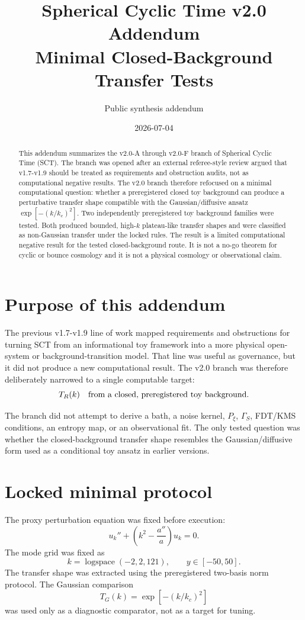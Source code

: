 \documentclass[11pt,a4paper]{article}
\title{Spherical Cyclic Time v2.0 Addendum\\Minimal Closed-Background Transfer Tests}
\author{Public synthesis addendum}
\date{2026-07-04}
\begin{document}
\maketitle

\begin{abstract}
This addendum summarizes the v2.0-A through v2.0-F branch of Spherical Cyclic Time (SCT). The branch was opened after an external referee-style review argued that v1.7-v1.9 should be treated as requirements and obstruction audits, not as computational negative results. The v2.0 branch therefore refocused on a minimal computational question: whether a preregistered closed toy background can produce a perturbative transfer shape compatible with the Gaussian/diffusive ansatz $\exp[-(k/k_c)^2]$. Two independently preregistered toy background families were tested. Both produced bounded, high-$k$ plateau-like transfer shapes and were classified as non-Gaussian transfer under the locked rules. The result is a limited computational negative result for the tested closed-background route. It is not a no-go theorem for cyclic or bounce cosmology and it is not a physical cosmology or observational claim.
\end{abstract}

\section{Purpose of this addendum}
The previous v1.7-v1.9 line of work mapped requirements and obstructions for turning SCT from an informational toy framework into a more physical open-system or background-transition model. That line was useful as governance, but it did not produce a new computational result. The v2.0 branch was therefore deliberately narrowed to a single computable target:
\[
T_R(k)\quad \hbox{from a closed, preregistered toy background.}
\]

The branch did not attempt to derive a bath, a noise kernel, $P_\xi$, $\Gamma_S$, FDT/KMS conditions, an entropy map, or an observational fit. The only tested question was whether the closed-background transfer shape resembles the Gaussian/diffusive form used as a conditional toy ansatz in earlier versions.

\section{Locked minimal protocol}
The proxy perturbation equation was fixed before execution:
\[
 u_k''+\left(k^2-\frac{a''}{a}\right)u_k=0.
\]
The mode grid was fixed as
\[
 k=\operatorname{logspace}(-2,2,121), \qquad y\in[-50,50].
\]
The transfer shape was extracted using the preregistered two-basis norm protocol. The Gaussian comparison
\[
 T_G(k)=\exp[-(k/k_c)^2]
\]
was used only as a diagnostic comparator, not as a target for tuning.
\end{document}
